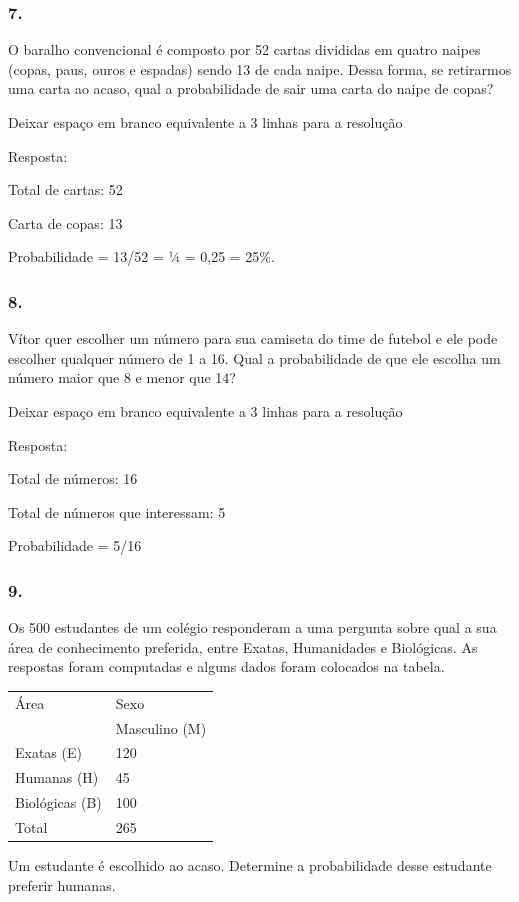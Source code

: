 \subsubsection{7.}\label{section-101}

O baralho convencional é composto por 52 cartas divididas em quatro
naipes (copas, paus, ouros e espadas) sendo 13 de cada naipe. Dessa
forma, se retirarmos uma carta ao acaso, qual a probabilidade de sair
uma carta do naipe de copas?

Deixar espaço em branco equivalente a 3 linhas para a resolução

Resposta:

Total de cartas: 52

Carta de copas: 13

Probabilidade = 13/52 = ¼ = 0,25 = 25\%.

\subsubsection{8.}\label{section-102}

Vítor quer escolher um número para sua camiseta do time de futebol e ele
pode escolher qualquer número de 1 a 16. Qual a probabilidade de que ele
escolha um número maior que 8 e menor que 14?

Deixar espaço em branco equivalente a 3 linhas para a resolução

Resposta:

Total de números: 16

Total de números que interessam: 5

Probabilidade = 5/16

\subsubsection{9.}\label{section-103}

Os 500 estudantes de um colégio responderam a uma pergunta sobre qual a
sua área de conhecimento preferida, entre Exatas, Humanidades e
Biológicas. As respostas foram computadas e alguns dados foram colocados
na tabela.

\begin{longtable}[]{@{}ll@{}}
\toprule
Área & Sexo\tabularnewline
& Masculino (M)\tabularnewline
Exatas (E) & 120\tabularnewline
Humanas (H) & 45\tabularnewline
Biológicas (B) & 100\tabularnewline
Total & 265\tabularnewline
\bottomrule
\end{longtable}

Um estudante é escolhido ao acaso. Determine a probabilidade desse
estudante preferir humanas.

